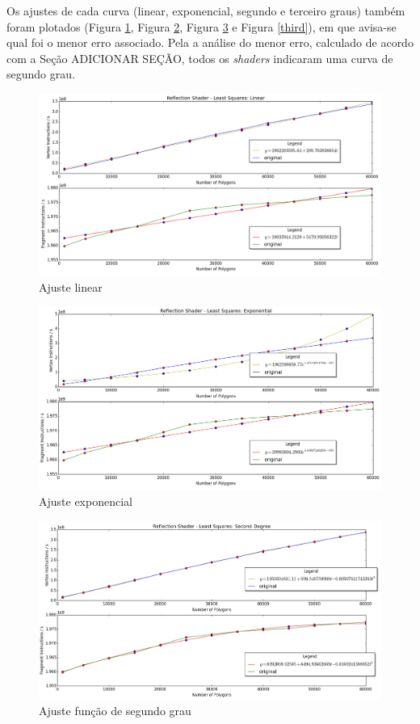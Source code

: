 	 Os ajustes de cada curva (linear, exponencial, segundo e terceiro graus) também foram plotados (Figura \ref{linear}, Figura \ref{exp}, Figura \ref{sec} e Figura \ref{third}), em que avisa-se qual foi o menor erro associado. Pela a análise do menor erro, calculado de acordo com a Seção ADICIONAR SEÇÃO, todos os \textit{shaders} indicaram uma curva de segundo grau.

	\begin{figure}[h]
	\centering
		\includegraphics[keepaspectratio=true,scale=0.4]{figuras/reflectionlinear.png}
	\caption{Ajuste linear}
	\label{linear}
	\end{figure}	

	\begin{figure}[h]
	\centering
		\includegraphics[keepaspectratio=true,scale=0.4]{figuras/reflectionexponential.png}
	\caption{Ajuste exponencial}
	\label{exp}
	\end{figure}	

	\begin{figure}[h]
	\centering
		\includegraphics[keepaspectratio=true,scale=0.4]{figuras/reflectionsec.png}
	\caption{Ajuste função de segundo grau}
	\label{sec}
	\end{figure}	

